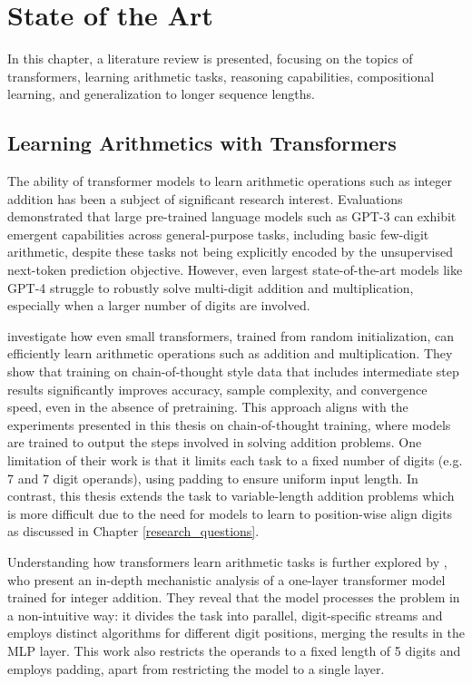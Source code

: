 \chapter{State of the Art}\label{sota}

In this chapter, a literature review is presented, focusing on the topics of transformers, learning arithmetic tasks, reasoning capabilities, compositional learning, and generalization to longer sequence lengths.


\section{Learning Arithmetics with Transformers}\label{sec:sota_arithmetic_tasks}

The ability of transformer models \parencite{vaswani_attention_2017} to learn arithmetic operations such as integer addition has been a subject of significant research interest. Evaluations demonstrated that large pre-trained language models such as GPT-3 \parencite{brown_language_2020} can exhibit emergent capabilities across general-purpose tasks, including basic few-digit arithmetic, despite these tasks not being explicitly encoded by the unsupervised next-token prediction objective. However, even largest state-of-the-art models like GPT-4 \parencite{achiam_gpt-4_2023} struggle to robustly solve multi-digit addition and multiplication, especially when a larger number of digits are involved.

\cite{lee_teaching_2023} investigate how even small transformers, trained from random initialization, can efficiently learn arithmetic operations such as addition and multiplication. They show that training on chain-of-thought style data that includes intermediate step results significantly improves accuracy, sample complexity, and convergence speed, even in the absence of pretraining. This approach aligns with the experiments presented in this thesis on chain-of-thought training, where models are trained to output the steps involved in solving addition problems. One limitation of their work is that it limits each task to a fixed number of digits (e.g. 7 and 7 digit operands), using padding to ensure uniform input length. In contrast, this thesis extends the task to variable-length addition problems which is more difficult due to the need for models to learn to position-wise align digits as discussed in Chapter \ref{research_questions}.

Understanding how transformers learn arithmetic tasks is further explored by \cite{quirke_understanding_2023}, who present an in-depth mechanistic analysis of a one-layer transformer model trained for integer addition. They reveal that the model processes the problem in a non-intuitive way: it divides the task into parallel, digit-specific streams and employs distinct algorithms for different digit positions, merging the results in the MLP layer. This work also restricts the operands to a fixed length of 5 digits and employs padding, apart from restricting the model to a single layer.

